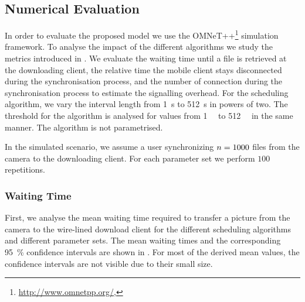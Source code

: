 \subsection{Numerical Evaluation}\label{sec:application:cloud_file_synchronisation:numerical_evaluation}
In order to evaluate the proposed model we use the OMNeT++\footnote{\url{http://www.omnetpp.org/}, \accessed} simulation framework.
To analyse the impact of the different algorithms we study the metrics introduced in .
We evaluate the waiting time \sojournTime until a file is retrieved at the downloading client, the relative time the mobile client stays disconnected \relativeDisconnectedTime during the synchronisation process, and the number of connection \connectionCount during the synchronisation process to estimate the signalling overhead.
For the \algointerval scheduling algorithm, we vary the interval length from \SI{1}{\second} to \SI{512}{\second} in powers of two.
The threshold for the \algosize algorithm is analysed for values from \SI{1}{\mega\byte} to \SI{512}{\mega\byte} in the same manner.
The \algoimmediate algorithm is not parametrised.

In the simulated scenario, we assume a user synchronizing \(n = 1000\) files from the camera to the downloading client.
For each parameter set we perform \(100\) repetitions.

\subsubsection*{Waiting Time}\label{sec:application:cloud_file_synchronisation:numerical_evaluation:waiting_time}
First, we analyse the mean waiting time \sojournTime required to transfer a picture from the camera to the wire-lined download client for the different scheduling algorithms and different parameter sets.
The mean waiting times \sojournTime and the corresponding \SI{95}{\percent} confidence intervals are shown in .
For most of the derived mean values, the confidence intervals are not visible due to their small size.

